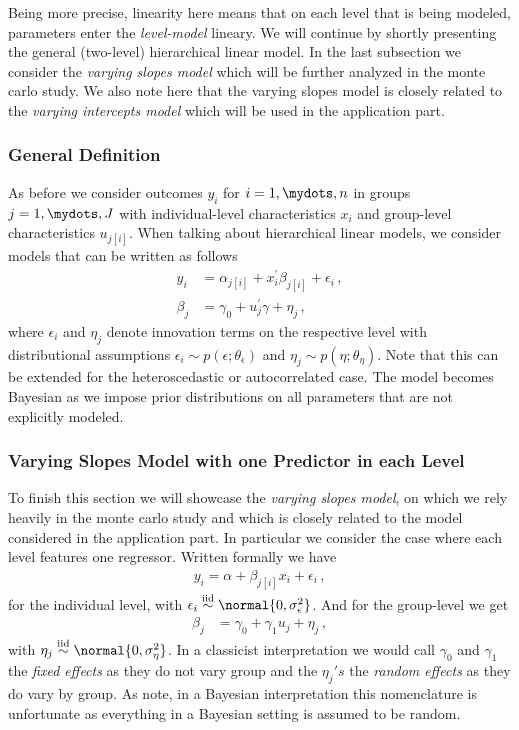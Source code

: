 Being more precise, linearity here means that on each level that is being modeled, parameters enter the \emph{level-model} lineary.
We will continue by shortly presenting the general (two-level) hierarchical linear model.
In the last subsection we consider the \emph{varying slopes model} which will be further analyzed in the monte carlo study.
We also note here that the varying slopes model is closely related to the \emph{varying intercepts model} which will be used in the application part.

\subsubsection*{General Definition}
As before we consider outcomes $y_i$ for $i=1,\mydots,n$ in groups $j=1,\mydots,J$ with individual-level characteristics $x_i$ and group-level characteristics $u_{j[i]}$.
When talking about hierarchical linear models, we consider models that can be written as follows
\begin{align}
  y_i &= \alpha_{j[i]} + x_i^\prime \beta_{j[i]} + \epsilon_i \,,\\
  \beta_j &= \gamma_0 + u_j^\prime \gamma + \eta_j \,,
\end{align}
where $\epsilon_i$ and $\eta_j$ denote innovation terms on the respective level with distributional assumptions $\epsilon_i \sim p(\epsilon; \theta_\epsilon)$ and $\eta_j \sim p(\eta; \theta_\eta)$.
Note that this can be extended for the heteroscedastic or autocorrelated case.
The model becomes Bayesian as we impose prior distributions on all parameters that are not explicitly modeled.

\subsubsection*{Varying Slopes Model with one Predictor in each Level}
To finish this section we will showcase the \emph{varying slopes model}, on which we rely heavily in the monte carlo study and which is closely related to the model considered in the application part.
In particular we consider the case where each level features one regressor.
Written formally we have
\begin{align}
  y_i = \alpha + \beta_{j[i]} x_i + \epsilon_i \,,
\end{align}
for the individual level, with $\epsilon_i \overset{\text{iid}}{\sim} \normal{0, \sigma_\epsilon^2}$.
And for the group-level we get
\begin{align}
  \beta_j &= \gamma_0 + \gamma_1 u_j + \eta_j \,,
\end{align}
with $\eta_j \overset{\text{iid}}{\sim} \normal{0, \sigma_\eta^2}$.
In a classicist interpretation we would call $\gamma_0$ and  $\gamma_1$ the \emph{fixed effects} as they do not vary group and the $\eta_j's$ the \emph{random effects} as they do vary by group.
As \citet{GelmanHill2007} note, in a Bayesian interpretation this nomenclature is unfortunate as everything in a Bayesian setting is assumed to be random.

